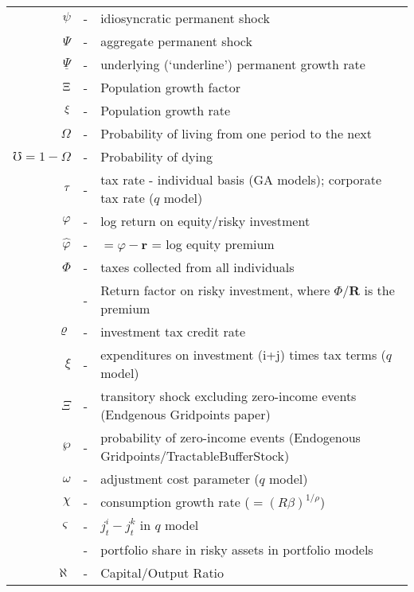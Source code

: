 \documentclass{handout}
\begin{document}
{\begin{tabular}{rcl}
\\  $\psi$    & - & idiosyncratic permanent shock
\\  $\Psi$    & - & aggregate permanent shock
\\  $\underline{\Psi}$ & - & underlying (`underline') permanent growth rate
\\  $\Xi$ & - & Population growth factor
\\  $\xi$ & - & Population growth rate
\\  $\Omega$   & - & Probability of living from one period to the next
\\  $\mho=1-\Omega$  & - & Probability of dying 
\\  $\tau$    & - & tax rate - individual basis (GA models); corporate tax rate ($q$ model)
\\  $\varphi$ & - & log return on equity/risky investment
\\  $\hat{\varphi}$ & - & $= \varphi - \mathbf{r}$ = log equity premium
\\  $\Phi$    & - & taxes collected from all individuals
\\            & - & Return factor on risky investment, where $\Phi/\mathbf{R}$ is the premium
\\  $\varrho$    & - & investment tax credit rate
\\  $\xi$     & - & expenditures on investment (i+j) times tax terms ($q$ model)
\\  $\Xi$     & - & transitory shock excluding zero-income events (Endgenous Gridpoints paper)
\\  $\wp$     & - & probability of zero-income events (Endogenous Gridpoints/TractableBufferStock)
\\  $\omega$  & - & adjustment cost parameter ($q$ model)
\\  $\chi$    & - & consumption growth rate ($=(R \beta)^{1/\rho}$)
\\  $\varsigma$ & - & $j_{t}^{i}-j_{t}^{k}$ in $q$ model
\\   & - & portfolio share in risky assets in portfolio models
\\  $\aleph$  & - & Capital/Output Ratio
\end{tabular}
}

\end{document}
